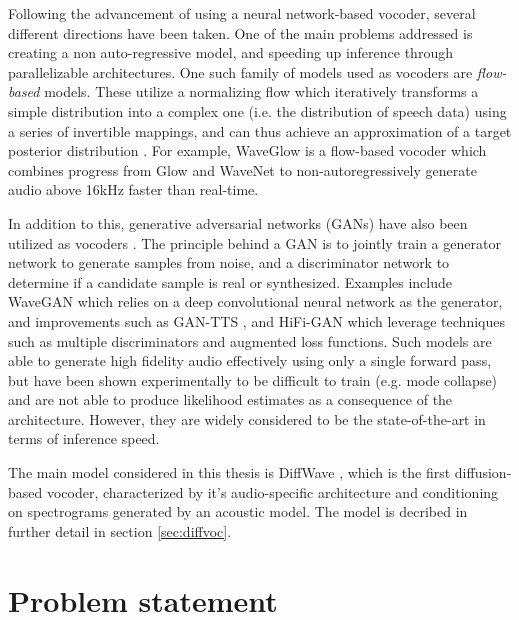 \documentclass{report}
\begin{document}
Following the advancement of using a neural network-based vocoder, several different directions have been taken. One of the main problems addressed is creating a non auto-regressive model, and speeding up inference through parallelizable architectures. One such family of models used as vocoders are \textit{flow-based} models. These utilize a normalizing flow which iteratively transforms a simple distribution into a complex one (i.e. the distribution of speech data) using a series of invertible mappings, and can thus achieve an approximation of a target posterior distribution \cite{rezende2015variational}. For example, WaveGlow \cite{prenger2019waveglow} is a flow-based vocoder which combines progress from Glow \cite{kingma2018glow} and WaveNet to non-autoregressively generate audio above 16kHz faster than real-time. 

In addition to this, generative adversarial networks (GANs) have also been utilized as vocoders \cite{goodfellow2020generative}. The principle behind a GAN is to jointly train a generator network to generate samples from noise, and a discriminator network to determine if a candidate sample is real or synthesized. Examples include WaveGAN \cite{donahue2018adversarial} which relies on a deep convolutional neural network as the generator, and improvements such as GAN-TTS \cite{binkowski2019high}, and HiFi-GAN \cite{kong2020hifi} which leverage techniques such as multiple discriminators and augmented loss functions. Such models are able to generate high fidelity audio effectively using only a single forward pass, but have been shown experimentally to be difficult to train (e.g. mode collapse) and are not able to produce likelihood estimates as a consequence of the architecture. However, they are widely considered to be the state-of-the-art in terms of inference speed.

The main model considered in this thesis is DiffWave \cite{kong2020diffwave}, which is the first diffusion-based vocoder, characterized by it's audio-specific architecture and conditioning on spectrograms generated by an acoustic model. The model is decribed in further detail in section \ref{sec:diffvoc}.

\section{Problem statement} \label{sec:statement}
\end{document}

